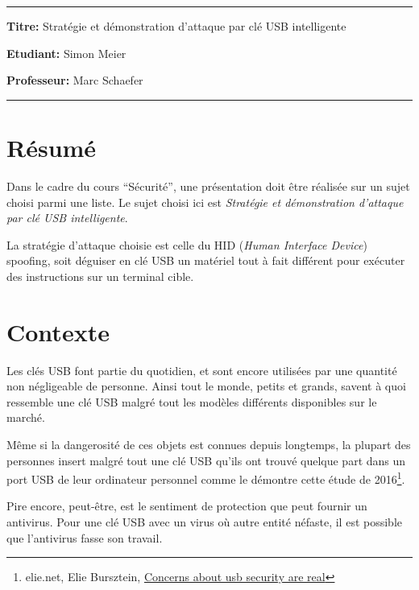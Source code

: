 \documentclass[
  french,
  paper=a4,
  ,captions=tableheading
]{scrartcl}
\begin{document}

\tableofcontents

\newpage

\begin{center}\rule{0.5\linewidth}{0.5pt}\end{center}

\textbf{Titre:} Stratégie et démonstration d'attaque par clé USB
intelligente

\textbf{Etudiant:} Simon Meier

\textbf{Professeur:} Marc Schaefer

\begin{center}\rule{0.5\linewidth}{0.5pt}\end{center}

\hypertarget{ruxe9sumuxe9}{%
\section{Résumé}\label{ruxe9sumuxe9}}

Dans le cadre du cours ``Sécurité'', une présentation doit être réalisée
sur un sujet choisi parmi une liste. Le sujet choisi ici est
\emph{Stratégie et démonstration d'attaque par clé USB intelligente}.

La stratégie d'attaque choisie est celle du HID (\emph{Human Interface
Device}) spoofing, soit déguiser en clé USB un matériel tout à fait
différent pour exécuter des instructions sur un terminal cible.

\hypertarget{contexte}{%
\section{Contexte}\label{contexte}}

Les clés USB font partie du quotidien, et sont encore utilisées par une
quantité non négligeable de personne. Ainsi tout le monde, petits et
grands, savent à quoi ressemble une clé USB malgré tout les modèles
différents disponibles sur le marché.

Même si la dangerosité de ces objets est connues depuis longtemps, la
plupart des personnes insert malgré tout une clé USB qu'ils ont trouvé
quelque part dans un port USB de leur ordinateur personnel comme le
démontre cette étude de 2016\footnote{elie.net, Elie Bursztein,
  \href{https://elie.net/blog/security/concerns-about-usb-security-are-real-48-percent-of-people-do-plug-in-usb-drives-found-in-parking-lots/}{Concerns
  about usb security are real}}.

Pire encore, peut-être, est le sentiment de protection que peut fournir
un antivirus. Pour une clé USB avec un virus où autre entité néfaste, il
est possible que l'antivirus fasse son travail.
\end{document}
